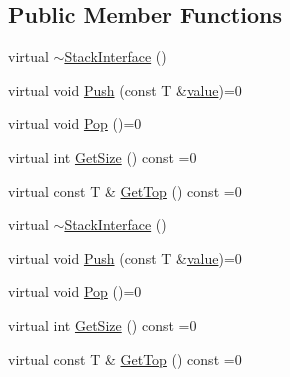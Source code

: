 \subsection*{Public Member Functions}
\begin{DoxyCompactItemize}
\item 
virtual \mbox{\hyperlink{classtesting_1_1gmock__generated__function__mockers__test_1_1_stack_interface_a87b83db3e9cb1c986d6b0649b37cfa7c}{$\sim$\+Stack\+Interface}} ()
\item 
virtual void \mbox{\hyperlink{classtesting_1_1gmock__generated__function__mockers__test_1_1_stack_interface_a49448f6195021fee947d37b80b6e5d30}{Push}} (const T \&\mbox{\hyperlink{_obj__test_2lib_2googletest-master_2googlemock_2test_2gmock-matchers__test_8cc_a337b8a670efc0b086ad3af163f3121b6}{value}})=0
\item 
virtual void \mbox{\hyperlink{classtesting_1_1gmock__generated__function__mockers__test_1_1_stack_interface_a1a6646d1d9febe90c607b9b3e4539b67}{Pop}} ()=0
\item 
virtual int \mbox{\hyperlink{classtesting_1_1gmock__generated__function__mockers__test_1_1_stack_interface_a537ec8647a2333f50e5f923a85b90eba}{Get\+Size}} () const =0
\item 
virtual const T \& \mbox{\hyperlink{classtesting_1_1gmock__generated__function__mockers__test_1_1_stack_interface_af36e32b9ae568100363466d1ebf95364}{Get\+Top}} () const =0
\item 
virtual \mbox{\hyperlink{classtesting_1_1gmock__generated__function__mockers__test_1_1_stack_interface_a87b83db3e9cb1c986d6b0649b37cfa7c}{$\sim$\+Stack\+Interface}} ()
\item 
virtual void \mbox{\hyperlink{classtesting_1_1gmock__generated__function__mockers__test_1_1_stack_interface_a49448f6195021fee947d37b80b6e5d30}{Push}} (const T \&\mbox{\hyperlink{_obj__test_2lib_2googletest-master_2googlemock_2test_2gmock-matchers__test_8cc_a337b8a670efc0b086ad3af163f3121b6}{value}})=0
\item 
virtual void \mbox{\hyperlink{classtesting_1_1gmock__generated__function__mockers__test_1_1_stack_interface_a1a6646d1d9febe90c607b9b3e4539b67}{Pop}} ()=0
\item 
virtual int \mbox{\hyperlink{classtesting_1_1gmock__generated__function__mockers__test_1_1_stack_interface_a537ec8647a2333f50e5f923a85b90eba}{Get\+Size}} () const =0
\item 
virtual const T \& \mbox{\hyperlink{classtesting_1_1gmock__generated__function__mockers__test_1_1_stack_interface_af36e32b9ae568100363466d1ebf95364}{Get\+Top}} () const =0

\end{DoxyCompactItemize}
